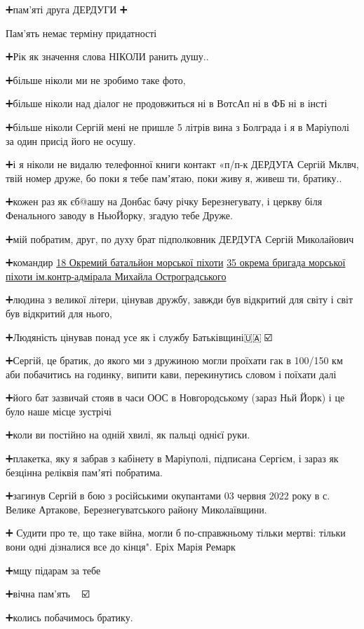➕пам'яті друга ДЕРДУГИ ➕\par
Пам'ять немає терміну придатності \par
➕Рік як значення слова НІКОЛИ ранить душу..\par
➕більше ніколи ми не зробимо таке фото,\par
➕більше ніколи над діалог не продовжиться ні в ВотсАп ні в ФБ ні в інсті \par
➕більше ніколи Сергій мені не пришле 5 літрів вина з Болграда і я в Маріуполі за один присід його не осушу.\par
➕і я ніколи не видалю телефонної книги  контакт «п/п-к ДЕРДУГА Сергій Мклвч, твій номер друже, бо поки я тебе памʼятаю, поки живу я, живеш ти, братику..\par
➕кожен раз як єб@ашу на Донбас бачу річку Березнегувату, і церкву біля Фенального заводу в НьюЙорку, згадую тебе Друже.\par
➕мій побратим, друг, по духу брат підполковник ДЕРДУГА Сергій Миколайович\par
➕командир \href{https://www.facebook.com/18obmp}{18 Окремий батальйон морської піхоти}  \href{https://www.facebook.com/35obrmp}{35 окрема бригада морської піхоти ім.контр-адмірала Михайла Остроградського} \par
➕людина з великої літери, цінував дружбу, завжди був відкритий для світу і світ був відкритий для нього, \par
➕Людяність цінував понад усе як і службу Батьківщині🇺🇦🫡☑️\par
➕Сергій, це братик, до якого ми з дружиною могли проїхати гак в 100/150 км аби побачитись на годинку, випити кави, перекинутись словом і поїхати далі\par
➕його бат зазвичай стояв в часи ООС в Новгородському (зараз Ньй Йорк) і це було наше місце зустрічі🤗\par
➕коли ви постійно на одній хвилі, як пальці однієї руки.\par
➕плакетка, яку я забрав з кабінету в Маріуполі, підписана Сергієм, і зараз як безцінна реліквія памʼяті побратима. \par
➕загинув Сергій в бою з російськими окупантами 03 червня 2022 року в с. Велике Артакове, Березнегуватського району Миколаївщини.\par
➕ Судити про те, що таке війна, могли б по-справжньому тільки мертві: тільки вони одні дізналися все до кінця". Еріх Марія Ремарк\par
➕мщу підарам за тебе🫡 \par
➕вічна пам'ять 🫡🇺🇦☑️\par
➕колись побачимось братику.\par
